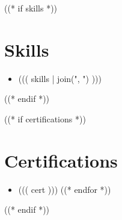 \documentclass[a4paper,10pt]{article}
\begin{document}
((* if skills *))
\section*{Skills}
\begin{itemize}[label={},leftmargin=0em]
    \item ((( skills | join(", ") )))
\end{itemize}
((* endif *))

((* if certifications *))
\section*{Certifications}
\begin{itemize}[leftmargin=1.5em]
((* for cert in certifications *))
    \item ((( cert )))
((* endfor *))
\end{itemize}
((* endif *))
\end{document}
